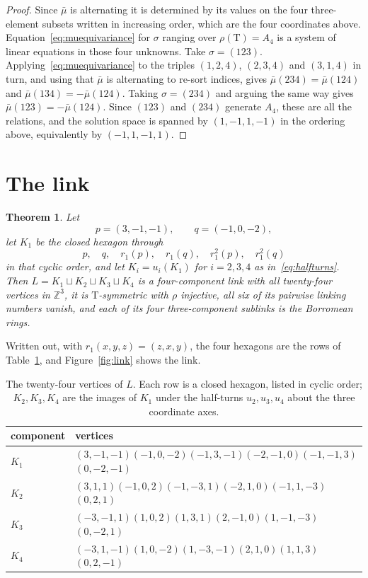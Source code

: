 \documentclass[11pt,a4paper]{article}
\theoremstyle{plain}
\newtheorem{theorem}{Theorem}[section]
\theoremstyle{definition}
\newcommand{\ZZ}{\mathbb{Z}}
\newcommand{\Tet}{\mathrm{T}}
\begin{document}
\begin{proof}
Since $\bar\mu$ is alternating it is determined by its values on the four
three-element subsets written in increasing order, which are the four
coordinates above. Equation~\eqref{eq:muequivariance} for $\sigma$ ranging over
$\rho(\Tet)=A_4$ is a system of linear equations in those four unknowns. Take
$\sigma=(123)$. Applying~\eqref{eq:muequivariance} to the triples $(1,2,4)$,
$(2,3,4)$ and $(3,1,4)$ in turn, and using that $\bar\mu$ is alternating to
re-sort indices, gives $\bar\mu(234)=\bar\mu(124)$ and
$\bar\mu(134)=-\bar\mu(124)$. Taking $\sigma=(234)$ and arguing the same way
gives $\bar\mu(123)=-\bar\mu(124)$. Since $(123)$ and $(234)$ generate $A_4$,
these are all the relations, and the solution space is spanned by
$(1,-1,1,-1)$ in the ordering above, equivalently by $(-1,1,-1,1)$.
\end{proof}

\section{The link}\label{sec:construction}

\begin{theorem}\label{thm:main}
Let
\[
  p=(3,-1,-1),\qquad q=(-1,0,-2),
\]
let $K_1$ be the closed hexagon through
\[
  p,\quad q,\quad r_1(p),\quad r_1(q),\quad r_1^2(p),\quad r_1^2(q)
\]
in that cyclic order, and let $K_i=u_i(K_1)$ for $i=2,3,4$ as
in~\eqref{eq:halfturns}. Then $L=K_1\sqcup K_2\sqcup K_3\sqcup K_4$ is a
four-component link with all twenty-four vertices in $\ZZ^3$, it is
$\Tet$-symmetric with $\rho$ injective, all six of its pairwise linking numbers
vanish, and each of its four three-component sublinks is the Borromean rings.
\end{theorem}

Written out, with $r_1(x,y,z)=(z,x,y)$, the four hexagons are the rows of
Table~\ref{tab:coords}, and Figure~\ref{fig:link} shows the link.

\begin{table}[htbp]
\centering\small
\begin{tabular}{@{}ll@{}}
\toprule
component & vertices\\
\midrule
\textcolor{ringA}{$K_1$} & $(3,-1,-1)$\quad $(-1,0,-2)$\quad $(-1,3,-1)$\quad $(-2,-1,0)$\quad $(-1,-1,3)$\quad $(0,-2,-1)$\\
\textcolor{ringB}{$K_2$} & $(3,1,1)$\quad $(-1,0,2)$\quad $(-1,-3,1)$\quad $(-2,1,0)$\quad $(-1,1,-3)$\quad $(0,2,1)$\\
\textcolor{ringC}{$K_3$} & $(-3,-1,1)$\quad $(1,0,2)$\quad $(1,3,1)$\quad $(2,-1,0)$\quad $(1,-1,-3)$\quad $(0,-2,1)$\\
\textcolor{ringD}{$K_4$} & $(-3,1,-1)$\quad $(1,0,-2)$\quad $(1,-3,-1)$\quad $(2,1,0)$\quad $(1,1,3)$\quad $(0,2,-1)$\\
\bottomrule
\end{tabular}
\caption{The twenty-four vertices of $L$. Each row is a closed hexagon, listed
in cyclic order; $K_2,K_3,K_4$ are the images of $K_1$ under the half-turns
$u_2,u_3,u_4$ about the three coordinate axes.}
\label{tab:coords}
\end{table}
\end{document}
